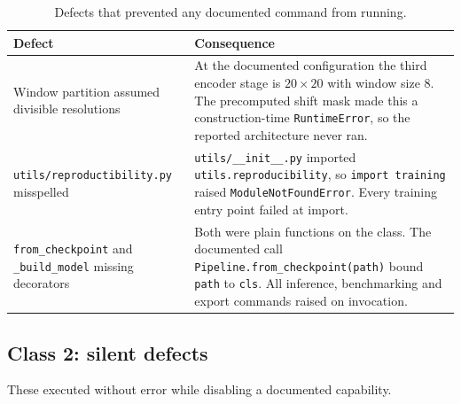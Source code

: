 \documentclass[11pt]{article}
\newcommand{\code}[1]{\texttt{\small #1}}
\begin{document}
\begin{table}[h]
\centering
\small
\begin{tabular}{@{}p{}p{}@{}}
\toprule
\textbf{Defect} & \textbf{Consequence} \\
\midrule
Window partition assumed divisible resolutions &
At the documented configuration the third encoder stage is $20\times20$ with
window size $8$. The precomputed shift mask made this a construction-time
\code{RuntimeError}, so the reported architecture never ran. \\[4pt]

\code{utils/reproductibility.py} misspelled &
\code{utils/\_\_init\_\_.py} imported \code{utils.reproducibility}, so
\code{import training} raised \code{ModuleNotFoundError}. Every training entry
point failed at import. \\[4pt]

\code{from\_checkpoint} and \code{\_build\_model} missing decorators &
Both were plain functions on the class. The documented call
\code{Pipeline.from\_checkpoint(path)} bound \code{path} to \code{cls}. All
inference, benchmarking and export commands raised on invocation. \\
\bottomrule
\end{tabular}
\caption{Defects that prevented any documented command from running.}
\end{table}

\subsection{Class 2: silent defects}

These executed without error while disabling a documented capability.
\end{document}
